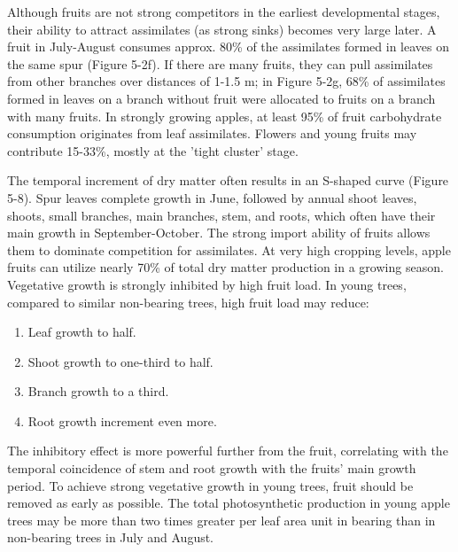 \vspace{0.5em}
Although fruits are not strong competitors in the earliest developmental stages, their ability to attract assimilates (as strong sinks) becomes very large later. A fruit in July-August consumes approx. 80\% of the assimilates formed in leaves on the same spur (Figure 5-2f). If there are many fruits, they can pull assimilates from other branches over distances of 1-1.5 m; in Figure 5-2g, 68\% of assimilates formed in leaves on a branch without fruit were allocated to fruits on a branch with many fruits. In strongly growing apples, at least 95\% of fruit carbohydrate consumption originates from leaf assimilates. Flowers and young fruits may contribute 15-33\%, mostly at the 'tight cluster' stage.

\vspace{0.5em}
The temporal increment of dry matter often results in an S-shaped curve (Figure 5-8). Spur leaves complete growth in June, followed by annual shoot leaves, shoots, small branches, main branches, stem, and roots, which often have their main growth in September-October. The strong import ability of fruits allows them to dominate competition for assimilates. At very high cropping levels, apple fruits can utilize nearly 70\% of total dry matter production in a growing season. Vegetative growth is strongly inhibited by high fruit load. In young trees, compared to similar non-bearing trees, high fruit load may reduce: 

\begin{enumerate} 
    \item Leaf growth to half. 
    \item Shoot growth to one-third to half. 
    \item Branch growth to a third. 
    \item Root growth increment even more. 
\end{enumerate} 

\vspace{0.5em}
The inhibitory effect is more powerful further from the fruit, correlating with the temporal coincidence of stem and root growth with the fruits' main growth period. To achieve strong vegetative growth in young trees, fruit should be removed as early as possible. The total photosynthetic production in young apple trees may be more than two times greater per leaf area unit in bearing than in non-bearing trees in July and August.

